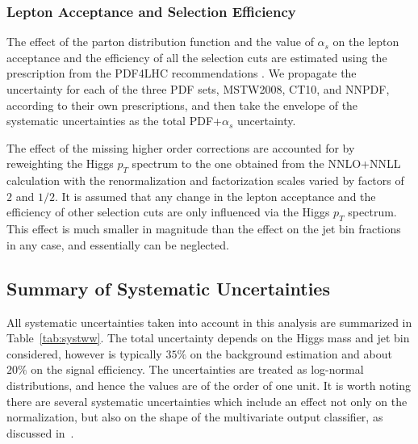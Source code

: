 \subsubsection{Lepton Acceptance and Selection Efficiency }

The effect of the parton distribution function and the value of $\alpha_{s}$
 on the lepton acceptance and the efficiency of all the selection cuts are 
estimated using the prescription from the PDF4LHC recommendations \cite{PDF4LHC}. We 
propagate the uncertainty for each of the three PDF sets, MSTW2008, CT10, and
NNPDF, according to their own prescriptions, and then take the envelope
of the systematic uncertainties as the total PDF+$\alpha_{s}$  uncertainty. 

The effect of the missing higher order corrections are accounted for by
reweighting the Higgs $p_{T}$ spectrum to the one obtained from the
NNLO+NNLL calculation with the renormalization and factorization scales
varied by factors of $2$ and $1/2$. It is assumed that any change in the
lepton acceptance and the efficiency of other selection cuts are only
influenced via the Higgs $p_{T}$ spectrum. This effect is much smaller in 
magnitude than the effect on the jet bin fractions in any case, and 
essentially can be neglected.



\subsection{Summary of Systematic Uncertainties}
All systematic uncertainties taken into account in this analysis
are summarized in Table~\ref{tab:systww}. 
The total uncertainty depends on the Higgs mass and jet bin considered,
however is typically $35\%$ on the background estimation and about $20\%$ 
on the signal efficiency. The uncertainties are treated as log-normal 
distributions, and hence the values are of the order of one unit. It is worth 
noting there are several systematic uncertainties which include an effect 
not only on the normalization, but also on the shape of the multivariate output 
classifier, as discussed in~\cite{MVASyst}.

